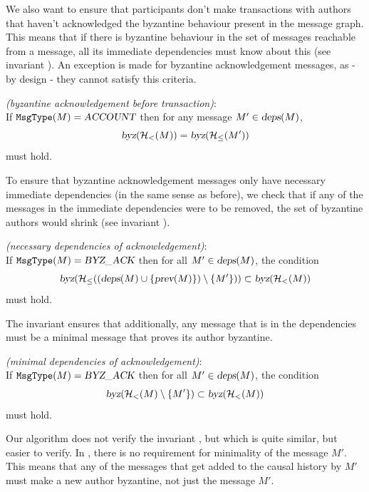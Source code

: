 We also want to ensure that participants don't make transactions with authors that haven't acknowledged the byzantine behaviour present in the message graph. This means that if there is byzantine behaviour in the set of messages reachable from a message, all its immediate dependencies must know about this (see invariant ). An exception is made for byzantine acknowledgement messages, as - by design - they cannot satisfy this criteria.
\begin{invariant}{}
    \emph{(byzantine acknowledgement before transaction)}:\\
    If $\texttt{MsgType}(M) = \textsl{ACCOUNT}$ then for any message $M' \in \textsl{deps}(M)$,
    $$\textsl{byz}(\mathcal H_<(M)) = \textsl{byz}(\mathcal H_\leq(M'))$$ must hold.
\end{invariant}

To ensure that byzantine acknowledgement messages only have necessary immediate dependencies (in the same sense as before), we check that if any of the messages in the immediate dependencies were to be removed, the set of byzantine authors would shrink (see invariant ).

\begin{invariant}{}
    \emph{(necessary dependencies of acknowledgement)}:\\
    If $\texttt{MsgType}(M) = \textsl{BYZ\_ACK}$ then for all $M'\in \textsl{deps}(M)$, the condition $$\textsl{byz}(\mathcal H_\le((\textsl{deps}(M) \cup \{\textsl{prev}(M)\}) \setminus \{M'\}) ) \subset \textsl{byz}(\mathcal H_<(M))$$ must hold.
\end{invariant}

The invariant  ensures that additionally, any message that is in the dependencies must be a minimal message that proves its author byzantine.

\begin{invariant}{}
    \emph{(minimal dependencies of acknowledgement)}:\\
    If $\texttt{MsgType}(M) = \textsl{BYZ\_ACK}$ then for all $M'\in \textsl{deps}(M)$, the condition $$\textsl{byz}(\mathcal H_<(M) \setminus \{M'\}) \subset \textsl{byz}(\mathcal H_<(M))$$ must hold.
\end{invariant}

Our algorithm does not verify the invariant , but  which is quite similar, but easier to verify. In , there is no requirement for minimality of the message $M'$. This means that any of the messages that get added to the causal history by $M'$ must make a new author byzantine, not just the message $M'$.

